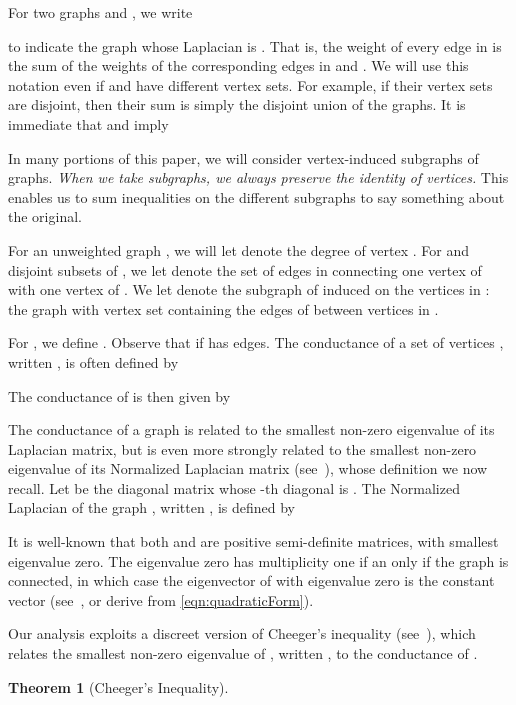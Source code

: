 \documentclass[11pt]{article}
\newtheorem{theorem}{Theorem}[section]
\begin{document}
For two graphs  and , we write

to indicate the graph whose Laplacian is .
That is, the weight of every edge in  is the sum of the weights of the
  corresponding edges in  and .
We will use this notation even if  and  have different vertex sets.
For example,
  if their vertex sets are disjoint, then their sum is simply
  the disjoint union of the graphs.
It is immediate that  and  imply

In many portions of this paper, we will consider vertex-induced subgraphs of graphs.
\textit{When we take subgraphs, we always preserve the identity of vertices.}
This enables us to sum inequalities on the different subgraphs to say something
  about the original.

For an unweighted graph , we will let  denote the degree
  of vertex .
For  and  disjoint subsets of , we let  denote the set of edges
  in  connecting one vertex of  with one vertex of .
We let  denote the subgraph of  induced on the vertices in :
  the graph with vertex set  containing the edges of  between
  vertices in .

For , we define .
Observe that  if  has  edges.
The conductance of a set of vertices , written
  , is often defined by

The conductance of  is then given by


The conductance of a graph is related  to the smallest non-zero
  eigenvalue of its Laplacian matrix,
  but is even more strongly related to the
  smallest non-zero eigenvalue of its Normalized Laplacian
  matrix (see~\cite{Chung}), whose definition we now recall.
Let  be the diagonal matrix whose -th diagonal is .
The Normalized Laplacian of the graph , written ,
  is defined by

It is well-known that both  and  are positive semi-definite matrices,
  with smallest eigenvalue zero.
The eigenvalue zero has multiplicity one if an only if the graph  is connected, in which case
  the eigenvector of  with eigenvalue zero is the constant vector
  (see~\cite[page 269]{BollobasMGT}, or derive from \eqref{eqn:quadraticForm}).


Our analysis exploits a discreet version of
  Cheeger's inequality\cite{Cheeger} (see~\cite{Chung,JerrumSinclair,DiaconisStrook}), which relates the smallest non-zero
  eigenvalue of , written , to the conductance of .
\begin{theorem}[Cheeger's Inequality]\label{thm:cheeger}

\end{theorem}
\end{document}
